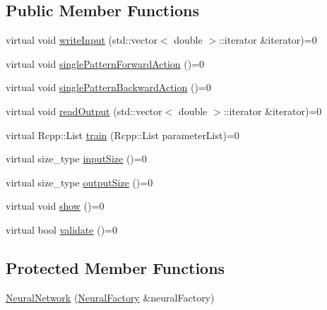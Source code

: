 \subsection*{Public Member Functions}
\begin{DoxyCompactItemize}
\item 
virtual void \hyperlink{class_neural_network_ad84eb675d31eab6e5d45c37f686d8186}{writeInput} (std::vector$<$ double $>$::iterator \&iterator)=0
\item 
virtual void \hyperlink{class_neural_network_aba99bf07f941e852ce0519266a997d3a}{singlePatternForwardAction} ()=0
\item 
virtual void \hyperlink{class_neural_network_a67e3bda920636659bd6b0635f177fcee}{singlePatternBackwardAction} ()=0
\item 
virtual void \hyperlink{class_neural_network_acb06905cd65e1f40b79cf2cc30e5987a}{readOutput} (std::vector$<$ double $>$::iterator \&iterator)=0
\item 
virtual Rcpp::List \hyperlink{class_neural_network_a3edff5f034de30abf24b73f8e81728a3}{train} (Rcpp::List parameterList)=0
\item 
virtual size\_\-type \hyperlink{class_neural_network_a9b59b8576a47750009669a6885524d1e}{inputSize} ()=0
\item 
virtual size\_\-type \hyperlink{class_neural_network_af7bbfbd5635c29d66fbb37e74800ec15}{outputSize} ()=0
\item 
virtual void \hyperlink{class_neural_network_abe7893d4df14b19f059f9fca0175cbe1}{show} ()=0
\item 
virtual bool \hyperlink{class_neural_network_a7ab39cee7bef69eff19cca490ff5d7c0}{validate} ()=0
\end{DoxyCompactItemize}
\subsection*{Protected Member Functions}
\begin{DoxyCompactItemize}
\item 
\hyperlink{class_neural_network_a94089745c72c49c41c51aaa73935145e}{NeuralNetwork} (\hyperlink{class_neural_factory}{NeuralFactory} \&neuralFactory)
\end{DoxyCompactItemize}

